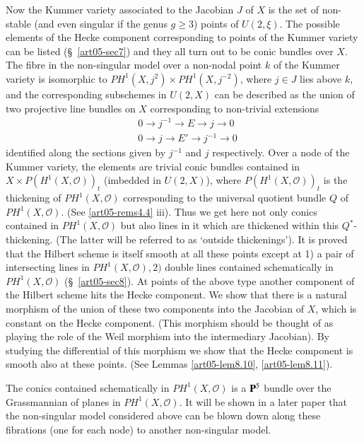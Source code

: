 Now the Kummer variety associated to the Jacobian $J$ of $X$ is the
set of non-stable (and even singular if the genus $g\geq 3$) points of
$U(2,\xi)$. The possible elements of the Hecke component corresponding
to points of the Kummer variety can be listed (\S~\ref{art05-sec7})
and they all turn out to be conic bundles over $X$. The fibre in the
non-singular model over a non-nodal point $k$ of the Kummer variety is
isomorphic to $PH^1(X,j^{2})\times PH^{1}(X,j^{-2})$, where $j\in J$
lies above $k$, and the corresponding subschemes in $U(2,X)$ can be
described as the union of two projective line bundles on $X$
corresponding to non-trivial extensions
\begin{align*}
& 0\to j^{-1}\to E\to j\to 0\\
& 0\to j\to E'\to j^{-1}\to 0
\end{align*}\pageoriginale
identified along the sections given by $j^{-1}$ and $j$
respectively. Over a node of the Kummer variety, the elements are
trivial conic bundles contained in $X\times
P(H^{1}(X,\mathscr{O}))_{t}$ (imbedded in $U(2,X)$), where
$P(H^{1}(X,\mathscr{O}))_{t}$ is the thickening of
$PH^{1}(X,\mathscr{O})$ corresponding to the universal quotient bundle
$Q$ of $PH^{1}(X,\mathscr{O})$. (See \ref{art05-rems4.4} iii). Thus we get here not
only conics contained in $PH^{1}(X,\mathscr{O})$ but also lines in it
which are thickened within this $Q^{*}$-thickening. (The latter will
be referred to as `outside thickenings'). It is proved that the
Hilbert scheme is itself smooth at all these points except at 1) a
pair of intersecting lines in $PH^{1}(X,\mathscr{O}),2)$ double lines
contained schematically in $PH^{1}(X,\mathscr{O})$
(\S~\ref{art05-sec8}). At points of the above type another component
of the Hilbert scheme hits the Hecke component. We show that there is
a natural morphism of the union of these two components into the
Jacobian of $X$, which is constant on the Hecke component. (This
morphism should be thought of as playing the role of the Weil morphism
into the intermediary Jacobian). By studying the differential of this
morphism we show that the Hecke component is smooth also at these
points. (See Lemmas \ref{art05-lem8.10}, \ref{art05-lem8.11}).

The conics contained schematically in $PH^{1}(X,\mathscr{O})$ is a
$\mathbf{P}^{5}$ bundle over the Grassmannian of planes in
$PH^{1}(X,\mathscr{O})$. It will be shown in a later paper that the
non-singular model considered above can be blown down along these
fibrations (one for each node) to another non-singular model.

